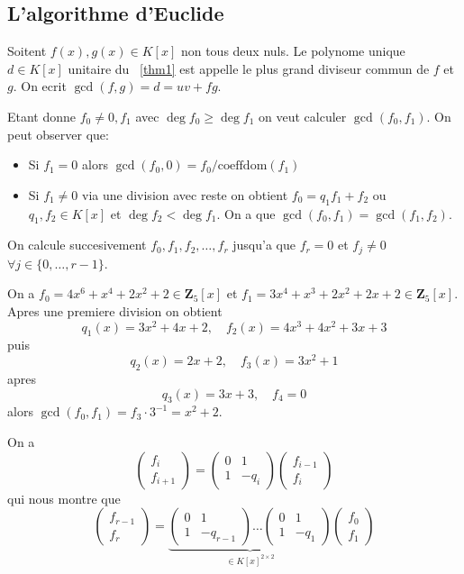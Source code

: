 \subsection{L'algorithme d'Euclide}

\begin{definition}
Soitent $f(x),g(x)\in K[x]$ non tous deux nuls. Le polynome unique $d\in K[x]$ unitaire du ~\ref{thm1} est appelle le plus grand diviseur commun de $f$ et $g$. On ecrit $\gcd(f,g)=d=uv+fg$.
\end{definition}

Etant donne $f_{0}\neq0,f_{1}$ avec $\deg f_{0}\ge \deg f_{1}$ on veut calculer $\gcd(f_{0},f_{1})$. On peut observer que:
\begin{itemize}
\item Si $f_{1}=0$ alors $\gcd(f_{0},0)=f_{0}/\mathrm{coeffdom}(f_1)$
\item Si $f_{1}\neq0$ via une division avec reste on obtient $f_{0}=q_{1}f_{1}+f_{2}$ ou $q_{1},f_{2}\in K[x]$ et $\deg f_{2}<\deg f_{1}$. On a que $\gcd(f_{0},f_{1})=\gcd(f_{1},f_{2})$.
\end{itemize}
On calcule succesivement $f_{0},f_{1},f_{2},\dots,f_{r}$ jusqu'a que $f_{r}=0$ et $f_{j}\neq0$ $\forall j\in \{ 0,\dots,r-1 \}$.
\begin{example}\label{exsem2}
On a $f_{0}=4x^{6}+x^{4}+2x^{2}+2\in \mathbf{Z}_{5}[x]$ et $f_{1}=3x^{4}+x^{3}+2x^{2}+2x+2\in \mathbf{Z}_{5}[x]$. Apres une premiere division on obtient 
$$
q_{1}(x)=3x^{2}+4x+2,\quad f_{2}(x)=4x^{3}+4x^{2}+3x+3
$$
puis
$$
q_{2}(x)=2x+2,\quad f_{3}(x)=3x^{2}+1
$$
apres
$$
q_{3}(x)=3x+3,\quad f_{4}=0
$$
alors $\gcd(f_{0},f_{1})=f_{3}\cdot3^{-1}=x^{2}+2$.
\end{example}
On a 
$$
\begin{pmatrix}
f_{i} \\
f_{i+1}
\end{pmatrix}=\begin{pmatrix}
0 & 1 \\
1 & -q_{i}
\end{pmatrix}\begin{pmatrix}
f_{i-1} \\
f_{i}
\end{pmatrix}
$$
qui nous montre que
$$
\begin{pmatrix}
f_{r-1} \\
f_{r}
\end{pmatrix}=\underbrace{\begin{pmatrix}
0 & 1 \\
1 & -q_{r-1}
\end{pmatrix}\dots \begin{pmatrix}
0 & 1 \\
1 & -q_{1}
\end{pmatrix}}_{\in K[x]^{2\times 2}}\begin{pmatrix}
f_{0} \\
f_{1}
\end{pmatrix}
$$
